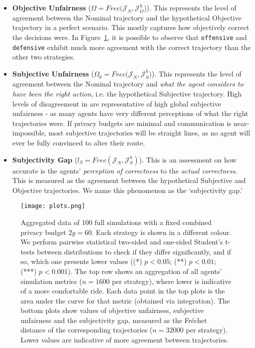 \documentclass[acmsmall]{custom-arxiv}  %
\begin{document}
\begin{itemize}
    \item \textbf{Objective Unfairness} ($\Omega = Frec(\mathcal{J}_N, \mathcal{J}^h_{O}$)). This represents the level of agreement between the Nominal trajectory and the hypothetical Objective trajectory in a perfect scenario. This mostly captures how objectively correct the decisions were. In Figure~\ref{fig:global-results}, it is possible to observe that \texttt{offensive} and \texttt{defensive} exhibit much more agreement with the correct trajectory than the other two strategies.
    \item \textbf{Subjective Unfairness} ($\Omega_p = Frec(\mathcal{J}_N, \mathcal{J}^h_{S}$)). This represents the level of agreement between the Nominal trajectory and \textit{what the agent considers to have been the right action}, i.e. the hypothetical Subjective trajectory. High levels of disagreement in are representative of high global subjective unfairness - as many agents have very different perceptions of what the right trajectories were. If privacy budgets are minimal and communication is near-impossible, most subjective trajectories will be straight lines, as no agent will ever be fully convinced to alter their route.
    \item \textbf{Subjectivity Gap} ($l_{S} = Frec(\mathcal{J}_N, \mathcal{J}^h_{S})$). This is an assessment on how accurate is the agents' \textit{perception of correctness} to the \textit{actual correctness}. This is measured as the agreement between the hypothetical Subjective and Objective trajectories. We name this phenomenon as the `subjectivity gap.'
\end{itemize}



\begin{figure}
\texttt{[image: plots.png]}
\caption{Aggregated data of 100 full simulations with a fixed combined privacy budget $2g=60$. Each strategy is shown in a different colour. We perform pairwise statistical two-sided and one-sided Student's t-tests between distributions to check if they differ significantly, and if so, which one presents lower values ((*) $p < 0.05$; (**) $p < 0.01$; (***) $p < 0.001$). The top row shows an aggregation of all agents' simulation metrics ($n = 1600$ per strategy), where lower is indicative of a more comfortable ride. Each data point in the top plots is the area under the curve for that metric (obtained via integration). The bottom plots show values of objective unfairness, subjective unfairness and the subjectivity gap, measured as the Fréchet distance of the corresponding trajectories ($n=32000$ per strategy). Lower values are indicative of more agreement between trajectories.}
\label{fig:global-results}
\end{figure}
\end{document}
